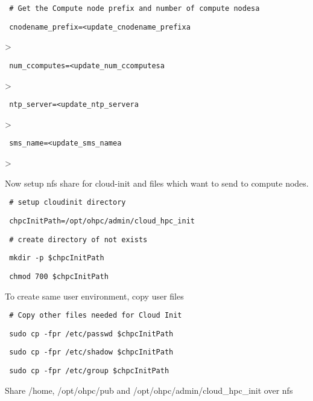 \begin{section}
\begin{bash}\texttt{\small{ \# Get the Compute node prefix and number of compute nodesa}}\end{bash}
\begin{bash}\texttt{\small{ cnodename\_prefix=<update\_cnodename\_prefixa}}\end{bash}>
\begin{bash}\texttt{\small{ num\_ccomputes=<update\_num\_ccomputesa}}\end{bash}>
\begin{bash}\texttt{\small{ ntp\_server=<update\_ntp\_servera}}\end{bash}>
\begin{bash}\texttt{\small{ sms\_name=<update\_sms\_namea}}\end{bash}>

Now setup nfs share for cloud-init and files which want to send to compute nodes.

\begin{bash}\texttt{\small{ \# setup cloudinit directory}}\end{bash}
\begin{bash}\texttt{\small{ chpcInitPath=/opt/ohpc/admin/cloud\_hpc\_init}}\end{bash}
\begin{bash}\texttt{\small{ \# create directory of not exists}}\end{bash}
\begin{bash}\texttt{\small{ mkdir -p \$chpcInitPath}}\end{bash}
\begin{bash}\texttt{\small{ chmod 700 \$chpcInitPath}}\end{bash}

To create same user environment, copy user files 

\begin{bash}\texttt{\small{ \# Copy other files needed for Cloud Init}}\end{bash}
\begin{bash}\texttt{\small{ sudo cp -fpr /etc/passwd \$chpcInitPath}}\end{bash}
\begin{bash}\texttt{\small{ sudo cp -fpr /etc/shadow \$chpcInitPath}}\end{bash}
\begin{bash}\texttt{\small{ sudo cp -fpr /etc/group \$chpcInitPath}}\end{bash}

Share /home, /opt/ohpc/pub and /opt/ohpc/admin/cloud\_hpc\_init over nfs


\end{section}
